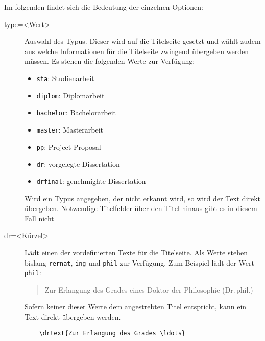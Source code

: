 \documentclass[
	ngerman,
	ruledheaders=chapter,%
	class=book,%
	thesis={
		type=dr,
		dr=rernat
	},
	accentcolor=9c,%
	custommargins=true,%
	marginpar=false,%
	parskip=half-,%
	fontsize=11pt,%
]{tudapub}
\let\code\texttt
\begin{document}
Im folgenden findet sich die Bedeutung der einzelnen Optionen:
\begin{description}
	\item[type=<Wert>] Auswahl des Typus. Dieser wird auf die Titelseite gesetzt und wählt zudem aus welche Informationen für die Titelseite zwingend übergeben werden müssen.
	Es stehen die folgenden Werte zur Verfügung:
	\begin{itemize}
		\item \code{sta}: Studienarbeit
		\item \code{diplom}: Diplomarbeit
		\item \code{bachelor}: Bachelorarbeit
		\item \code{master}: Masterarbeit
		\item \code{pp}: Project-Proposal
		\item \code{dr}: vorgelegte Dissertation
		\item \code{drfinal}: genehmighte Dissertation
	\end{itemize}
	Wird ein Typus angegeben, der nicht erkannt wird, so wird der Text direkt übergeben. Notwendige Titelfelder über den Titel hinaus gibt es in diesem Fall nicht	
	\item[dr=<Kürzel>] Lädt einen der vordefinierten Texte für die Titelseite. Als Werte stehen bislang \code{rernat}, \code{ing} und \code{phil} zur Verfügung. Zum Beispiel lädt der Wert \code{phil}:
	\begin{quote}
	Zur Erlangung des Grades eines Doktor der Philosophie (Dr.\,phil.)
	\end{quote}
	Sofern keiner dieser Werte dem angestrebten Titel entspricht, kann ein Text direkt übergeben werden. 
	\begin{verbatim}
	\drtext{Zur Erlangung des Grades \ldots}
	\end{verbatim}
	

\end{description}
\end{document}
